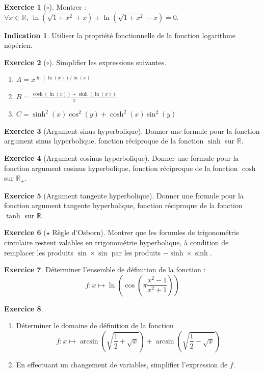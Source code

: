 \documentclass[french]{book}
\newcommand{\R}{\mathbb{R}}
\theoremstyle{definition}
\newtheorem{ex}{Exercice}[chapter]
\theoremstyle{theorem}
\newtheorem*{ind}{Indication}
\theoremstyle{remark}
\begin{document}
\begin{ex}[$\circ$]
	Montrer : $\forall x\in\R,\ \ln\left(\sqrt{1+x^2}+x\right)+\ln\left(\sqrt{1+x^2}-x\right)=0$.
\end{ex}

\begin{ind}
	Utiliser la propriété fonctionnelle de la fonction logarithme népérien.
\end{ind}

\begin{ex}[$\circ$]
	Simplifier les expressions suivantes.
	\begin{enumerate}
		\item $A=x^{\ln(\ln(x))/\ln(x)}$
		\item $B=\displaystyle\frac{\cosh(\ln(x))+\sinh(\ln(x))}{x}$
		\item $C=\sinh^2(x)\cos^2(y)+\cosh^2(x)\sin^2(y)$
	\end{enumerate}
\end{ex}

\begin{ex}[Argument sinus hyperbolique]
	Donner une formule pour la fonction argument sinus hyperbolique, fonction réciproque de la fonction $\sinh$ sur $\R$.
\end{ex}

\begin{ex}[Argument cosinus hyperbolique]
	Donner une formule pour la fonction argument cosinus hyperbolique, fonction réciproque de la fonction $\cosh$ sur $\R_+$.
\end{ex}

\begin{ex}[Argument tangente hyperbolique]
	Donner une formule pour la fonction argument tangente hyperbolique, fonction réciproque de la fonction $\tanh$ sur $\R$.
\end{ex}

\begin{ex}[$\star$ Règle d'Osborn]
	Montrer que les formules de trigonométrie circulaire restent valables en trigonométrie hyperbolique, à condition de remplacer les produits $\sin\times\sin$ par les produits $-\sinh\times\sinh$.
\end{ex}

\begin{ex}
	Déterminer l'ensemble de définition de la fonction : $$f:x\mapsto\ln\left(\cos\left(\pi\frac{x^2-1}{x^2+1}\right)\right)$$
\end{ex}

\begin{ex}
	\begin{enumerate}
		\item Déterminer le domaine de définition de la fonction $$f:x\mapsto\arcsin\left(\sqrt{\frac{1}{2}+\sqrt{x}}\right)+\arcsin\left(\sqrt{\frac{1}{2}-\sqrt{x}}\right)$$
		\item En effectuant un changement de variables, simplifier l'expression de $f$.
	\end{enumerate}
\end{ex}
\end{document}
